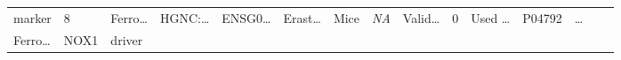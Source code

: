 \documentclass[
]{article}
\begin{document}
\begin{longtable}[]{@{}lllllllllllllll@{}}
\begin{minipage}[t]{0.04\columnwidth}
marker\strut
\end{minipage} & \begin{minipage}[t]{0.02\columnwidth}\raggedright
8\strut
\end{minipage} & \begin{minipage}[t]{0.05\columnwidth}\raggedright
Ferro\ldots{}\strut
\end{minipage} & \begin{minipage}[t]{0.05\columnwidth}\raggedright
HGNC:\ldots{}\strut
\end{minipage} & \begin{minipage}[t]{0.05\columnwidth}\raggedright
ENSG0\ldots{}\strut
\end{minipage} & \begin{minipage}[t]{0.05\columnwidth}\raggedright
Erast\ldots{}\strut
\end{minipage} & \begin{minipage}[t]{0.05\columnwidth}\raggedright
Mice\strut
\end{minipage} & \begin{minipage}[t]{0.05\columnwidth}\raggedright
\emph{NA}\strut
\end{minipage} & \begin{minipage}[t]{0.05\columnwidth}\raggedright
Valid\ldots{}\strut
\end{minipage} & \begin{minipage}[t]{0.05\columnwidth}\raggedright
0\strut
\end{minipage} & \begin{minipage}[t]{0.05\columnwidth}\raggedright
Used \ldots{}\strut
\end{minipage} & \begin{minipage}[t]{0.05\columnwidth}\raggedright
P04792\strut
\end{minipage} & \begin{minipage}[t]{0.02\columnwidth}\raggedright
\ldots{}\strut
\end{minipage}\tabularnewline
\begin{minipage}[t]{0.05\columnwidth}\raggedright
Ferro\ldots{}\strut
\end{minipage} & \begin{minipage}[t]{0.05\columnwidth}\raggedright
NOX1\strut
\end{minipage} & \begin{minipage}[t]{0.04\columnwidth}\raggedright
driver\strut
\end{minipage} & \begin{minipage}[t]{0.02\columnwidth}\raggedright

\end{minipage}
\end{longtable}
\end{document}

